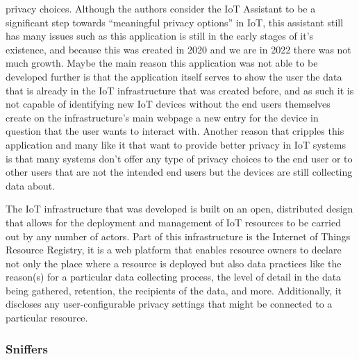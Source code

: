 \documentclass[conference]{IEEEtran}
\begin{document}
privacy choices. Although the authors consider the IoT Assistant to be a significant
step towards ``meaningful privacy options'' in IoT, this assistant still has many
issues such as this application is still in the early stages of it's existence,
and because this was created in 2020 and we are in 2022 there was not much growth.
Maybe the main reason this application was not able to be developed further is
that the application itself serves to show the user the data that is already in
the IoT infrastructure that was created before, and as such it is not capable of
identifying new IoT devices without the end users themselves create on the
infrastructure's main webpage \cite{DasPersonalized} a new entry for the device
in question that the user wants to interact with. Another reason that cripples this
application and many like it that want to provide better privacy in IoT systems is
that many systems don't offer any type of privacy choices to the end user or to
other users that are not the intended end users but the devices are still collecting
data about.

The IoT infrastructure that was developed \cite{DasPersonalized} is built on an open,
distributed design that allows for the deployment and management of IoT resources
to be carried out by any number of actors. Part of this infrastructure is the
Internet of Things Resource Registry, it is a web platform that enables resource
owners to declare not only the place where a resource is deployed but also data
practices like the reason(s) for a particular data collecting process, the level of
detail in the data being gathered, retention, the recipients of the data, and more.
Additionally, it discloses any user-configurable privacy settings that might be
connected to a particular resource.

\subsubsection{Sniffers}
\end{document}

